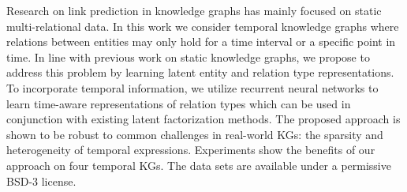 Research on link prediction in knowledge graphs has mainly focused on static multi-relational data. In this work we consider temporal knowledge graphs where relations between entities may only hold for a time interval or a specific point in time. In line with previous work on static knowledge graphs, we propose to address this problem by learning latent entity and relation type representations. To incorporate temporal information, we utilize recurrent neural networks to learn time-aware representations of relation types which can be used in conjunction with existing latent factorization methods. The proposed approach is shown to be robust to common challenges in real-world KGs: the sparsity and heterogeneity of temporal expressions. Experiments show the benefits of our approach on four temporal KGs. The data sets are available under a permissive BSD-3 license.
